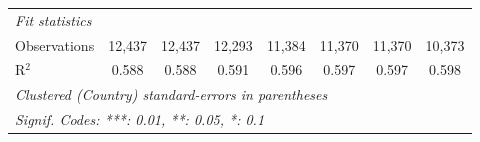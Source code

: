 \begin{tabular}{lccccccc}
   \midrule \emph{Fit statistics}\\
   Observations                                                                & 12,437  & 12,437       & 12,293        & 11,384        & 11,370        & 11,370        & 10,373\\  
   R$^2$                                                                       & 0.588   & 0.588        & 0.591         & 0.596         & 0.597         & 0.597         & 0.598\\  
   \midrule
   \multicolumn{8}{l}{\emph{Clustered (Country) standard-errors in parentheses}}\\
   \multicolumn{8}{l}{\emph{Signif. Codes: ***: 0.01, **: 0.05, *: 0.1}}\\
\end{tabular}
\par\endgroup


